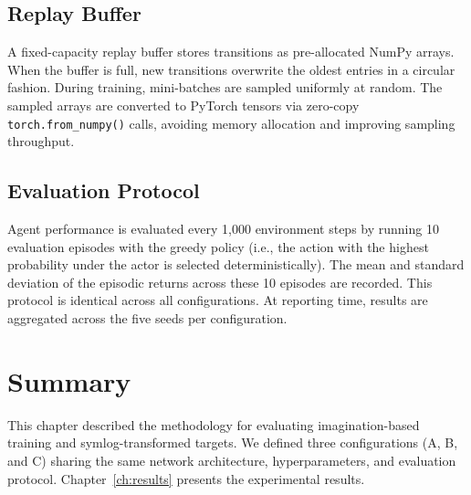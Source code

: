 \subsection{Replay Buffer}
\label{subsec:method_buffer}

A fixed-capacity replay buffer stores transitions as pre-allocated NumPy arrays.
When the buffer is full, new transitions overwrite the oldest entries in a
circular fashion. During training, mini-batches are sampled uniformly at random.
The sampled arrays are converted to PyTorch tensors via zero-copy
\texttt{torch.from\_numpy()} calls, avoiding memory allocation and
improving sampling throughput.

\subsection{Evaluation Protocol}
\label{subsec:method_eval}

Agent performance is evaluated every 1{,}000 environment steps by running 10
evaluation episodes with the greedy policy (i.e., the action with the highest
probability under the actor is selected deterministically). The mean and standard
deviation of the episodic returns across these 10 episodes are recorded. This
protocol is identical across all configurations. At reporting time, results are aggregated across
the five seeds per configuration.

\section{Summary}
\label{sec:method_summary}

This chapter described the methodology for evaluating imagination-based training and symlog-transformed targets. We defined three configurations (A, B, and C) sharing the same network architecture, hyperparameters, and evaluation protocol. Chapter~\ref{ch:results} presents the experimental results.